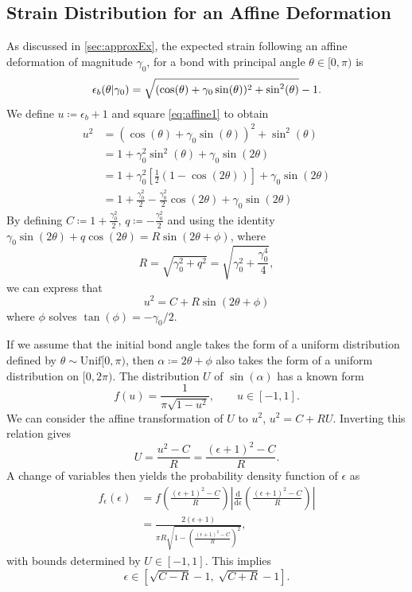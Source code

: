 \documentclass[asymmetricmargins]{library/duthesis}%
\newcommand{\DiffReportBodyFont}{\small}
\newenvironment{DiffReportContent}
  {\begingroup\DiffReportBodyFont}
  {\par\endgroup\medskip}
\begin{document}
\begin{DiffReportContent}
\begin{subappendices}
\section{Strain Distribution for an Affine Deformation} \relax
As discussed in \cref{sec:approxEx}, the expected strain following an affine deformation of magnitude $\gamma_0$, for a bond with principal angle $\theta\in[0,\pi)$ is
\begin{equation}
         \epsilon_b(\theta| \gamma_0) = \sqrt{(\cos(\theta) + \gamma_0\sin(\theta))^2 + \sin^2(\theta)} - 1. \relax
\end{equation}
We define $u\coloneq\epsilon_b+1$ and square \cref{eq:affine1} to obtain
\begin{align*}
        u^2 
        &=(\cos(\theta) + \gamma_0\sin(\theta))^2 + \sin^2(\theta) \\
        &= 1+\gamma_0^2\sin^2(\theta) + \gamma_0\sin(2\theta) \\
        &= 1 + \gamma_0^2\left[\frac{1}{2}(1-\cos(2\theta))\right] + \gamma_0\sin(2\theta)\\
        &= 1+ \frac{\gamma_0^2}{2} - \frac{\gamma_0^2}{2}\cos(2\theta)+\gamma_0\sin(2\theta)
\end{align*}
By defining $C\coloneq1+ \frac{\gamma_0^2}{2}$, $q\coloneq- \frac{\gamma_0^2}{2}$ and using the identity $\gamma_0\sin(2\theta)+q\cos(2\theta)=R\sin(2\theta + \phi)$, where 
\begin{equation*}
    R=\sqrt{\gamma_0^2+q^2}=\sqrt{\gamma_0^2+\frac{\gamma_0^4}{4}},
\end{equation*}
we can express that
\begin{equation*}
    u^2=C+R\sin(2\theta+\phi)
\end{equation*}
where $\phi$ solves $\tan(\phi) = -\gamma_0/2$.

If we assume that the initial bond angle takes the form of a uniform distribution defined by $\theta \sim \text{Unif}[0,\pi)$, then $\alpha\coloneq2\theta+\phi$ also takes the form of a uniform distribution on $[0,2\pi)$. The distribution $U$ of $\sin(\alpha)$ has a known form 
\[
    f(u)=\frac{1}{\pi\sqrt{1-u^2}}, \qquad u\in[-1,1].
\]
We can consider the affine transformation of $U$ to $u^2$, $u^2 = C + R U$.
Inverting this relation gives
\[
    U = \frac{u^2 - C}{R} = \frac{(\epsilon+1)^2 - C}{R}.
\]
A change of variables then yields the probability density function of $\epsilon$ as
\begin{align*}
    f_\epsilon(\epsilon)
    &= f\left(\frac{(\epsilon+1)^2-C}{R}\right)
      \left|\frac{\mathrm{d}}{\mathrm{d}\epsilon}
      \left(\frac{(\epsilon+1)^2-C}{R}\right)\right| \\
    &= \frac{2(\epsilon+1)}{\pi R\sqrt{1-\left(\frac{(\epsilon+1)^2-C}{R}\right)^2}},
\end{align*}
with bounds determined by $U\in[-1,1]$. This implies
\[
    \epsilon \in \left[\sqrt{C-R}-1,\; \sqrt{C+R}-1\right].
\]


\end{subappendices}
\end{DiffReportContent}
\end{document}
